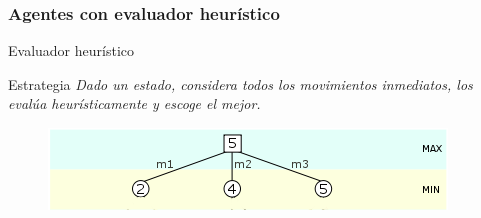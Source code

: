 \documentclass[10pt]{beamer}
\begin{document}
\begin{frame}[t]
\frametitle{Agentes con evaluador heurístico}

%

{\huge Evaluador heurístico}
\begin{block}{Estrategia}
\textit{Dado un estado, considera todos los movimientos inmediatos, los evalúa heurísticamente y escoge el mejor.}
\begin{figure}[t]
\centering
\includegraphics[scale=0.5]{imagenes/evaluadorHeuristico.png}
\label{fig:jug_evaluador}
\end{figure}
\end{block}


\end{frame}
\end{document}
